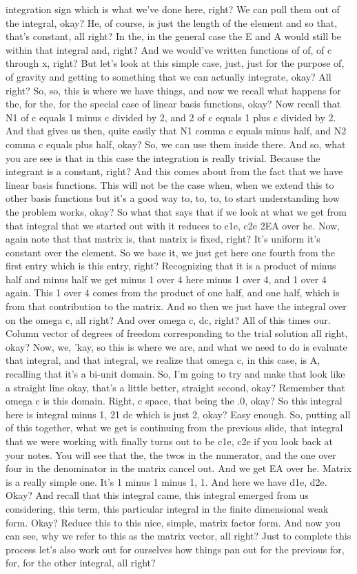 \documentclass[10pt]{article}
\begin{document}
integration sign which is what we've done here, right? We can pull them out of the integral, okay? He, of course, is just the length of the element and so that, that's constant, all right? In the, in the general case the E and A would still be within that integral and, right? And we would've written functions of of, of c through x, right? But let's look at this simple case, just, just for the purpose of, of gravity and getting to something that we can actually integrate, okay? All right? So, so, this is where we have things, and now we recall what happens for the, for the, for the special case of linear basis functions, okay? Now recall that N1 of c equals 1 minus c divided by 2, and 2 of c equals 1 plus c divided by 2. And that gives us then, quite easily that N1 comma c equals minus half, and N2 comma c equals plus half, okay? So, we can use them inside there. And so, what you are see is that in this case the integration is really trivial. Because the integrant is a constant, right? And this comes about from the fact that we have linear basis functions. This will not be the case when, when we extend this to other basis functions but it's a good way to, to, to, to start understanding how the problem works, okay? So what that says that if we look at what we get from that integral that we started out with it reduces to c1e, c2e 2EA over he. Now, again note that that matrix is, that matrix is fixed, right? It's uniform it's constant over the element. So we base it, we just get here one fourth from the first entry which is this entry, right? Recognizing that it is a product of minus half and minus half we get minus 1 over 4 here minus 1 over 4, and 1 over 4 again. This 1 over 4 comes from the product of one half, and one half, which is from that contribution to the matrix. And so then we just have the integral over on the omega c, all right? And over omega c, dc, right? All of this times our. Column vector of degrees of freedom corresponding to the trial solution all right, okay? Now, we, 'kay, so this is where we are, and what we need to do is evaluate that integral, and that integral, we realize that omega c, in this case, is A, recalling that it's a bi-unit domain. So, I'm going to try and make that look like a straight line okay, that's a little better, straight second, okay? Remember that omega c is this domain. Right, c space, that being the .0, okay? So this integral here is integral minus 1, 21 dc which is just 2, okay? Easy enough. So, putting all of this together, what we get is continuing from the previous slide, that integral that we were working with finally turns out to be c1e, c2e if you look back at your notes. You will see that the, the twos in the numerator, and the one over four in the denominator in the matrix cancel out. And we get EA over he. Matrix is a really simple one. It's 1 minus 1 minus 1, 1. And here we have d1e, d2e. Okay? And recall that this integral came, this integral emerged from us considering, this term, this particular integral in the finite dimensional weak form. Okay? Reduce this to this nice, simple, matrix factor form. And now you can see, why we refer to this as the matrix vector, all right? Just to complete this process let's also work out for ourselves how things pan out for the previous for, for, for the other integral, all right? 
\end{document}

